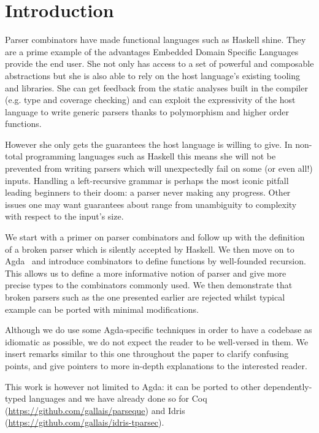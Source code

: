 
\section{Introduction}

Parser combinators have made functional languages such as Haskell
shine. They are a prime example of the advantages Embedded Domain
Specific Languages~\cite{hudak1996building} provide the end user. She not only has access
to a set of powerful and composable abstractions but she is also
able to rely on the host language's existing tooling and libraries.
She can get feedback from the static analyses built in the compiler
(e.g. type and coverage checking) and can exploit the expressivity
of the host language to write generic parsers thanks to polymorphism
and higher order functions.

However she only gets the guarantees the host language is willing
to give. In non-total programming languages such as Haskell this
means she will not be prevented from writing parsers which will
unexpectedly fail on some (or even all!) inputs. Handling a
left-recursive grammar is perhaps the most iconic pitfall leading
beginners to their doom: a parser never making any progress.
Other issues one may want guarantees about range from unambiguity
to complexity with respect to the input's size.

We start with a primer on parser combinators and follow up with the
definition of a broken parser which is silently accepted by Haskell.
We then move on to Agda~\cite{norell2009dependently} and introduce combinators to
define functions by well-founded recursion. This allows us to define
a more informative notion of parser and give more precise types to
the combinators commonly used. We then demonstrate that broken parsers
such as the one presented earlier are rejected whilst typical example
can be ported with minimal modifications.

 Although we do use some Agda-specific techniques
in order to have a codebase as idiomatic as possible, we do not expect
the reader to be well-versed in them. We insert remarks similar to this
one throughout the paper to clarify confusing points, and give pointers
to more in-depth explanations to the interested reader.

This work is however not limited to Agda: it can be ported to other
dependently-typed languages and we have already done so for Coq~\cite{Coq:manual}
(\url{https://github.com/gallais/parseque}) and
Idris~\cite{brady2013idris} (\url{https://github.com/gallais/idris-tparsec}).


